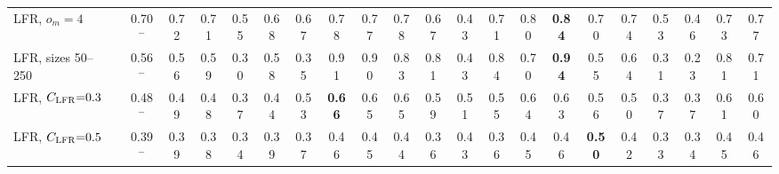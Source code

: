 \begin{table}[p]
{\begin{tabular}{llcccc|cc|cccccc|cccccccc}
LFR, $o_m{=}4$ &  & 0.70$^{-}$ & 0.72 & 0.71 & 0.55 & 0.68 & 0.67 & 0.78 & 0.77 & 0.78 & 0.67 & 0.43 & 0.71 & 0.80 & \textbf{0.84} & 0.70 & 0.74 & 0.53 & 0.46 & 0.73 & 0.77 \\
LFR, sizes 50--250 &  & 0.56$^{-}$ & 0.56 & 0.59 & 0.30 & 0.58 & 0.35 & 0.91 & 0.90 & 0.83 & 0.81 & 0.43 & 0.84 & 0.70 & \textbf{0.94} & 0.55 & 0.64 & 0.31 & 0.23 & 0.81 & 0.71 \\
LFR, $C_{\rm LFR}{=}0.3$ &  & 0.48$^{-}$ & 0.49 & 0.48 & 0.37 & 0.44 & 0.53 & \textbf{0.66} & 0.65 & 0.65 & 0.59 & 0.51 & 0.55 & 0.64 & 0.63 & 0.56 & 0.50 & 0.37 & 0.37 & 0.61 & 0.60 \\
LFR, $C_{\rm LFR}{=}0.5$ &  & 0.39$^{-}$ & 0.39 & 0.38 & 0.34 & 0.39 & 0.37 & 0.46 & 0.45 & 0.44 & 0.36 & 0.43 & 0.36 & 0.45 & 0.46 & \textbf{0.50} & 0.42 & 0.33 & 0.34 & 0.45 & 0.46 \\
\hline\hline
\end{tabular}}
\end{table}

